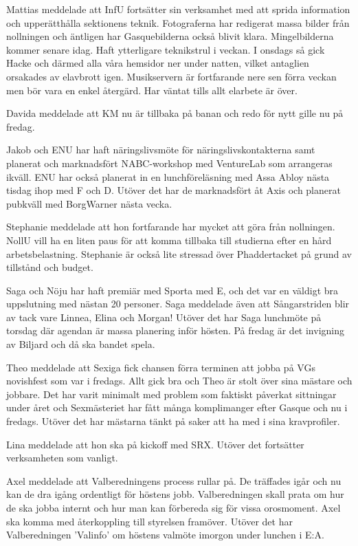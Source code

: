 \documentclass[10pt]{article}
\begin{document}
\begin{paragrafer}
\begin{paragrafer}
Mattias meddelade att InfU fortsätter sin verksamhet med att sprida information och upperätthålla sektionens teknik. 
Fotograferna har redigerat massa bilder från nollningen och äntligen har Gasquebilderna också blivit klara. Mingelbilderna kommer senare idag. 
Haft ytterligare teknikstrul i veckan. I onsdags så gick Hacke och därmed alla våra hemsidor ner under natten, vilket antaglien orsakades av elavbrott igen. Musikservern är fortfarande nere sen förra veckan men bör vara en enkel återgärd. Har väntat tills allt elarbete är över. 

Davida meddelade att KM nu är tillbaka på banan och redo för nytt gille nu på fredag.   

Jakob och ENU har haft näringslivsmöte för näringslivskontakterna samt planerat och marknadsfört NABC-workshop med VentureLab som arrangeras ikväll. ENU har också planerat in en lunchföreläsning med Assa Abloy nästa tisdag ihop med F och D. 
Utöver det har de marknadsfört åt Axis och planerat pubkväll med BorgWarner nästa vecka. 

Stephanie meddelade att hon fortfarande har mycket att göra från nollningen. NollU vill ha en liten paus för att komma tillbaka till studierna efter en hård arbetsbelastning. 
Stephanie är också lite stressad över Phaddertacket på grund av tillstånd och budget. 

Saga och Nöju har haft premiär med Sporta med E, och det var en väldigt bra uppslutning med nästan 20 personer. Saga meddelade även att Sångarstriden blir av tack vare Linnea, Elina och Morgan!
Utöver det har Saga lunchmöte på torsdag där agendan är massa planering inför hösten. På fredag är det invigning av Biljard och då ska bandet spela. 

Theo meddelade att Sexiga fick chansen förra terminen att jobba på VGs novishfest som var i fredags. Allt gick bra och Theo är stolt över sina mästare och jobbare. Det har varit minimalt med problem som faktiskt påverkat sittningar under året och Sexmästeriet har fått många komplimanger efter Gasque och nu i fredags. 
Utöver det har mästarna tänkt på saker att ha med i sina kravprofiler. 

Lina meddelade att hon ska på kickoff med SRX. Utöver det fortsätter verksamheten som vanligt. 

Axel meddelade att Valberedningens process rullar på. De träffades igår och nu kan de dra igång ordentligt för höstens jobb. 
Valberedningen skall prata om hur de ska jobba internt och hur man kan förbereda sig för vissa orosmoment. Axel ska komma med återkoppling till styrelsen framöver. 
Utöver det har Valberedningen 'Valinfo' om höstens valmöte imorgon under lunchen i E:A. 


\end{paragrafer}
\end{paragrafer}
\end{document}
